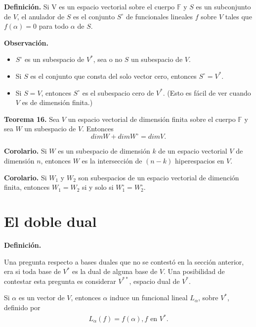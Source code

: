 \newpage
\textbf{Definición.} Si V es un espacio vectorial sobre el cuerpo
$\mathbb{F}$ y $S$ es un subconjunto de $V$, el anulador de $S$ es
el conjunto $S^\circ$ de funcionales lineales $f$ sobre $V$ tales
que $f(\alpha) = 0$ para todo $\alpha$ de $S$.

\textbf{Observación.}
\begin{itemize}
    \item $S^{\circ}$ es un subespacio de $V^{\ast}$, sea o no $S$
    un subespacio de $V$.
    \item Si $S$ es el conjunto que consta del solo vector cero,
    entonces $S^{\circ} = V^{\ast}$.
    \item Si $S = V$, entonces $S^{\circ}$ es el subespacio cero de
    $V^{\ast}$. (Esto es fácil de ver cuando $V$ es de dimensión
    finita.)
\end{itemize}

\textbf{Teorema 16.} Sea $V$ un espacio vectorial de dimensión finita
sobre el cuerpo $\mathbb{F}$ y sea $W$ un subespacio de $V$. Entonces
$$dim W + dim W^{\circ} = dim V.$$

\textbf{Corolario.} Si $W$ es un subespacio de dimensión $k$ de un
espacio vectorial $V$ de dimensión $n$, entonces $W$ es la
intersección de $(n - k)$ hiperespacios en $V$.

\textbf{Corolario.} Si $W_{1}$ y $W_{2}$ son subespacios de un espacio
vectorial de dimención finita, entonces $W_{1} = W_{2}$ si y solo
si $W_{1}^{\circ} = W_{2}^{\circ}$.

\section{{\Large El doble dual}}
\textbf{Definición.}

Una pregunta respecto a bases duales que no se contestó en la sección
anterior, era si toda base de $V^{\ast}$ es la dual de alguna base de $V$.
Una posibilidad de contestar esta pregunta es considerar $V^{\ast\ast}$,
espacio dual de $V^{\ast}$.

Si $\alpha$ es un vector de $V$, entonces $\alpha$ induce
un funcional lineal $L_{\alpha}$, sobre $V^{\ast}$, definido por
\begin{align}
    L_{\alpha}(f)=f(\alpha),  f \text{ en }V^{\ast}.
\end{align}